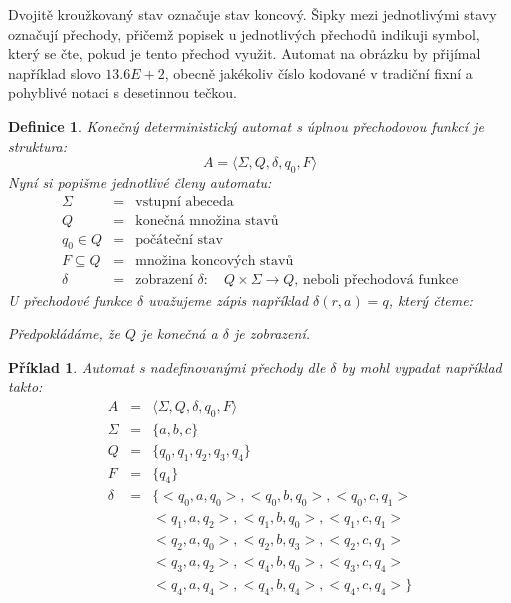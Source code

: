 \documentclass[10pt,a4paper]{article}
\theoremstyle{note}
\newtheorem{definice}{Definice}
\newtheorem{priklad}{Příklad}
\begin{document}
Dvojitě kroužkovaný stav označuje stav koncový. Šipky mezi jednotlivými stavy označují přechody, přičemž popisek u jednotlivých přechodů
indikuji symbol, který se čte, pokud je tento přechod využit. Automat na obrázku  by přijímal například slovo $13.6E+2$, obecně
jakékoliv číslo kodované v tradiční fixní a pohyblivé notaci s desetinnou tečkou.

\begin{definice}
Konečný deterministický automat s úplnou přechodovou funkcí je struktura:
$$
A = \langle \Sigma, Q, \delta, q_0, F \rangle
$$
Nyní si popišme jednotlivé členy automatu:
\begin{eqnarray*}
\Sigma &=& \text{vstupní abeceda} \\
Q &=& \text{konečná množina stavů} \\
q_0 \in Q &=& \text{počáteční stav} \\
F \subseteq Q &=& \text{množina koncových stavů} \\
\delta &=& \text{zobrazení } \delta:\quad Q \times \Sigma \rightarrow Q \text{, neboli přechodová funkce}
\end{eqnarray*}
U přechodové funkce $\delta$ uvažujeme zápis například $\delta(r, a) = q$, který čteme: 

Předpokládáme, že $Q$ je konečná a $\delta$ je zobrazení.
\end{definice}

\begin{priklad}
Automat s nadefinovanými přechody dle $\delta$ by mohl vypadat například takto:
\begin{eqnarray*}
A &=& \langle \Sigma, Q, \delta, q_0, F \rangle \\
\Sigma &=& \lbrace a, b, c \rbrace \\
Q &=& \lbrace q_0, q_1, q_2, q_3, q_4 \rbrace \\
F &=& \lbrace q_4 \rbrace \\
\delta &=& \lbrace <q_0, a, q_0>, <q_0, b, q_0>, <q_0, c, q_1> \\
& & <q_1, a, q_2>, <q_1, b, q_0>, <q_1, c, q_1> \\
& & <q_2, a, q_0>, <q_2, b, q_3>, <q_2, c, q_1> \\
& & <q_3, a, q_2>, <q_4, b, q_0>, <q_3, c, q_4> \\
& & <q_4, a, q_4>, <q_4, b, q_4>, <q_4, c, q_4> \rbrace
\end{eqnarray*}
\end{priklad}
\end{document}
